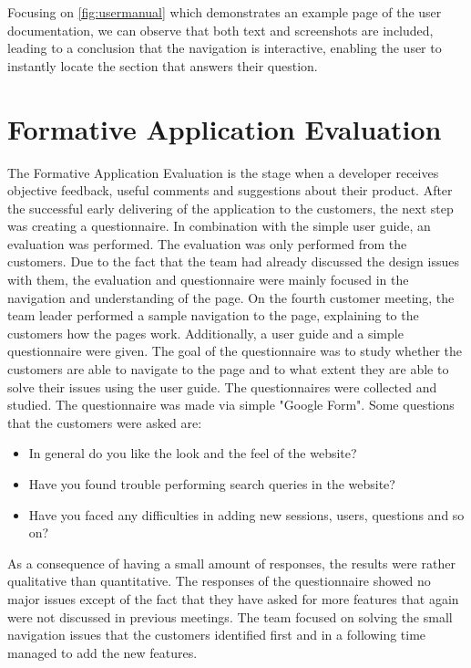 \documentclass{l3proj}
\begin{document}
Focusing on \autoref{fig:usermanual} which demonstrates an example page of the user documentation, we can observe that both text and screenshots are included, leading to a conclusion that the navigation is interactive, enabling the user to instantly locate the section that answers their question.

\section{Formative Application Evaluation}
\label{sec:appEval}

The Formative Application Evaluation is the stage when a developer receives objective feedback, useful comments and suggestions about their product.  After the successful early delivering of the application to the customers, the next step was creating a questionnaire. In combination with the simple user guide, an evaluation was performed. The evaluation was only performed from the customers. Due to the fact that the team had already discussed the design issues with them, the evaluation and questionnaire were mainly focused in the navigation and understanding of the page. On the  fourth customer meeting, the team leader performed a sample navigation to the page, explaining to the customers how the pages work.  Additionally, a user guide and a simple questionnaire were given. The goal of the questionnaire was to study whether the customers are able to navigate to the page and to what extent they are able to solve their issues using the user guide. The questionnaires were collected and studied.  The questionnaire was made via simple "Google Form". Some questions that the customers were asked are:
\begin{itemize}
 \item In general do you like the look and the feel of the website?
 \item Have you found trouble performing search queries in the website?
 \item Have you faced any difficulties in adding new sessions, users, questions and so on?
\end{itemize}

As a consequence of having a small amount of responses, the results were rather qualitative than quantitative. The responses of the questionnaire showed no major issues except of the fact that they have asked for more features that again were not discussed in previous meetings.  The team focused on solving the small navigation issues that the customers identified first and in a following time managed to add the new features.
\end{document}
